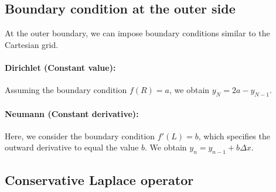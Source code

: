\documentclass[
	superscriptaddress,
	twocolumn,
	aps, pre
]{revtex4-1}
\newcommand{\dx}{\Delta x}
\begin{document}
\subsection{Boundary condition at the outer side}
At the outer boundary, we can impose boundary conditions similar to the Cartesian grid.

\paragraph{Dirichlet (Constant value):}
Assuming the boundary condition $f(R) = a$, we obtain $y_N = 2a - y_{N-1}$.

\paragraph{Neumann (Constant derivative):}
Here, we consider the boundary condition $f'(L) = b$, which specifies the outward derivative to equal the value $b$.
We obtain $y_n = y_{n-1} + b \dx$.

\subsection{Conservative Laplace operator}
\end{document}
